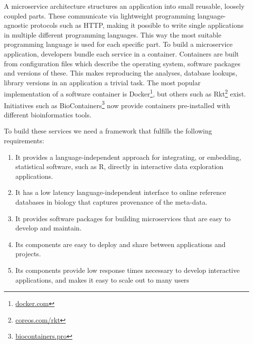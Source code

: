 
A microservice architecture structures an application into small reusable,
loosely coupled parts. These communicate via lightweight programming
language-agnostic protocols such as HTTP, making it possible to write single
applications in multiple different programming languages. This way the
most suitable programming language is used for each specific part. To build a
microservice application, developers bundle each service in a container.
Containers are built from configuration files which describe the operating
system, software packages and versions of these. 
This makes reproducing the analyses, database lookups, library versions in an
application a trivial task. The most popular implementation of a software
container is Docker\footnote{\url{docker.com}}, but others such as
Rkt\footnote{\url{coreos.com/rkt}} exist. Initiatives such as
BioContainers\footnote{\url{biocontainers.pro}} now provide containers
pre-installed with different bioinformatics tools. 

To build these services we need a framework that fulfills the following
requirements: 

\begin{enumerate}
    \item It provides a language-independent approach for integrating, or
        embedding, statistical software, such as R, directly in 
        interactive data exploration applications.
    \item It has a low latency language-independent interface to online
        reference databases in biology that captures provenance of the
        meta-data. 
    \item It provides software packages for building microservices that are easy
        to develop and maintain. 
    \item Its components are easy to deploy and share between applications and
        projects. 
    \item Its components provide low response times necessary to develop
        interactive applications, and makes it easy to scale out to many users
\end{enumerate} 

